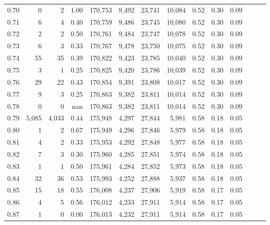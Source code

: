 \begin{tabular}{rrrrrrrrrrrrrr}
0.70 &       0 &      2 &  1.00 &  170,753 &    9,492 &  23,741 &  10,084 &  0.52 &  0.30 &      0.09 \\
0.71 &       6 &      4 &  0.40 &  170,759 &    9,486 &  23,745 &  10,080 &  0.52 &  0.30 &      0.09 \\
0.72 &       2 &      2 &  0.50 &  170,761 &    9,484 &  23,747 &  10,078 &  0.52 &  0.30 &      0.09 \\
0.73 &       6 &      3 &  0.33 &  170,767 &    9,478 &  23,750 &  10,075 &  0.52 &  0.30 &      0.09 \\
0.74 &      55 &     35 &  0.39 &  170,822 &    9,423 &  23,785 &  10,040 &  0.52 &  0.30 &      0.09 \\
0.75 &       3 &      1 &  0.25 &  170,825 &    9,420 &  23,786 &  10,039 &  0.52 &  0.30 &      0.09 \\
0.76 &      29 &     22 &  0.43 &  170,854 &    9,391 &  23,808 &  10,017 &  0.52 &  0.30 &      0.09 \\
0.77 &       9 &      3 &  0.25 &  170,863 &    9,382 &  23,811 &  10,014 &  0.52 &  0.30 &      0.09 \\
0.78 &       0 &      0 &   nan &  170,863 &    9,382 &  23,811 &  10,014 &  0.52 &  0.30 &      0.09 \\
0.79 &   5,085 &  4,033 &  0.44 &  175,948 &    4,297 &  27,844 &   5,981 &  0.58 &  0.18 &      0.05 \\
0.80 &       1 &      2 &  0.67 &  175,949 &    4,296 &  27,846 &   5,979 &  0.58 &  0.18 &      0.05 \\
0.81 &       4 &      2 &  0.33 &  175,953 &    4,292 &  27,848 &   5,977 &  0.58 &  0.18 &      0.05 \\
0.82 &       7 &      3 &  0.30 &  175,960 &    4,285 &  27,851 &   5,974 &  0.58 &  0.18 &      0.05 \\
0.83 &       1 &      1 &  0.50 &  175,961 &    4,284 &  27,852 &   5,973 &  0.58 &  0.18 &      0.05 \\
0.84 &      32 &     36 &  0.53 &  175,993 &    4,252 &  27,888 &   5,937 &  0.58 &  0.18 &      0.05 \\
0.85 &      15 &     18 &  0.55 &  176,008 &    4,237 &  27,906 &   5,919 &  0.58 &  0.17 &      0.05 \\
0.86 &       4 &      5 &  0.56 &  176,012 &    4,233 &  27,911 &   5,914 &  0.58 &  0.17 &      0.05 \\
0.87 &       1 &      0 &  0.00 &  176,013 &    4,232 &  27,911 &   5,914 &  0.58 &  0.17 &      0.05 \\

\end{tabular}
